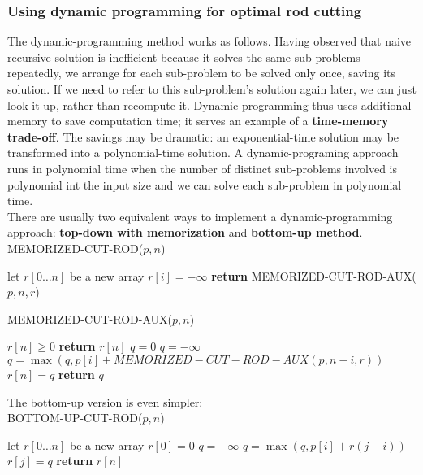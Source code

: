 \documentclass[12pt]{article}
\begin{document}
\subsubsection*{Using dynamic programming for optimal rod cutting}

The dynamic-programming method works as follows. Having observed that naive recursive solution is inefficient because it solves the same sub-problems repeatedly, we arrange for each sub-problem to be solved only once, saving its solution. If we need to refer to this sub-problem's solution again later, we can just look it up, rather than recompute it. Dynamic programming thus uses additional memory to save computation time; it serves an example of a \textbf{time-memory trade-off}. The savings may be dramatic: an exponential-time solution may be transformed into a polynomial-time solution. A dynamic-programing approach runs in polynomial time when the number of distinct sub-problems involved is polynomial int the input size and we can solve each sub-problem in polynomial time. \\

There are usually two equivalent ways to implement a dynamic-programming approach: \textbf{top-down with memorization} and \textbf{bottom-up method}. \\

MEMORIZED-CUT-ROD($p, n$)
\begin{algorithmic}[1]
\State let $r[0 \dots n]$ be a new array
	\State $r[i] = -\infty$
\EndFor
\State \textbf{return } MEMORIZED-CUT-ROD-AUX($p, n, r$)
\end{algorithmic}


MEMORIZED-CUT-ROD-AUX($p, n$)
\begin{algorithmic}[1]
\If $r[n] \ge 0$
	\State \textbf{return } $r[n]$
\EndIf
{}
	\State $q = 0$
\Else
	\State $q = -\infty$
        	\State $q = \max(q, p[i] + MEMORIZED-CUT-ROD-AUX(p, n-i, r))$
        \EndFor
\EndIf
\State $r[n] = q$
\State \textbf{return } $q$
\end{algorithmic}

The bottom-up version is even simpler: \\

BOTTOM-UP-CUT-ROD($p, n$)
\begin{algorithmic}[1]
\State let $r[0 \dots n]$ be a new array
\State $r[0] = 0$
	\State $q = -\infty$
        	\State $q = \max(q, p[i] + r(j-i))$
        \EndFor
        \State $r[j] = q$
\EndFor
\State \textbf{return } $r[n]$
\end{algorithmic}
\end{document}
